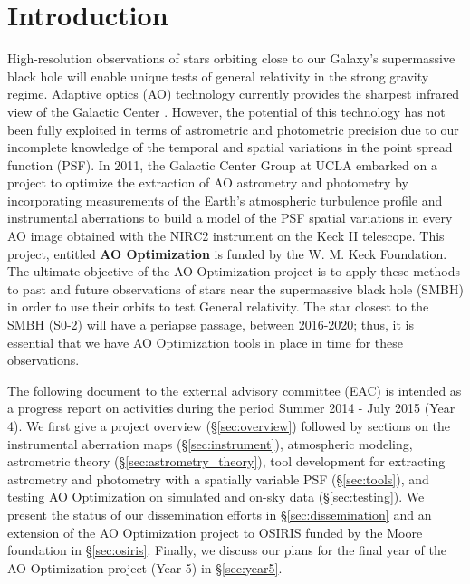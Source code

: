 \section{Introduction}

High-resolution observations of stars orbiting close to our Galaxy's supermassive black hole will enable unique tests of general relativity in the strong gravity regime. Adaptive optics (AO) technology currently provides the sharpest infrared view of the Galactic Center \cite{Ghez_2005}. However, the potential of this technology has not been fully exploited in terms of astrometric and photometric precision due to our incomplete knowledge of the temporal and spatial variations in the point spread function (PSF). In 2011, the Galactic Center Group at UCLA embarked on a project to optimize the extraction of AO astrometry and photometry by incorporating measurements of the Earth's atmospheric turbulence profile and instrumental aberrations to build a model of the PSF spatial variations in every AO image obtained with the NIRC2 instrument on the Keck II telescope. This project, entitled \textbf{AO Optimization} is funded by the W. M. Keck Foundation. The ultimate objective of the AO Optimization project is to apply these methods to past and future observations of stars near the supermassive black hole (SMBH) in order to use their orbits to test General relativity. The star closest to the SMBH (S0-2) will have a periapse passage, between 2016-2020; thus, it is essential that we have AO Optimization tools in place in time for these observations. 

The following document to the external advisory committee (EAC) is intended as a progress report on activities during the period Summer 2014 - July 2015 (Year 4). We first give a project overview (\S\ref{sec:overview}) followed by sections on the instrumental aberration maps (\S\ref{sec:instrument}), atmospheric modeling, astrometric theory (\S\ref{sec:astrometry_theory}), tool development for extracting astrometry and photometry with a spatially variable PSF (\S\ref{sec:tools}), and testing AO Optimization on simulated and on-sky data (\S\ref{sec:testing}). We present the status of our dissemination efforts in \S\ref{sec:dissemination} and an extension of the AO Optimization project to OSIRIS funded by the Moore foundation in \S\ref{sec:osiris}. Finally, we discuss our plans for the final year of the AO Optimization project (Year 5) in \S\ref{sec:year5}.





    
    
    
    
    
    
    
  
  
  
  
  